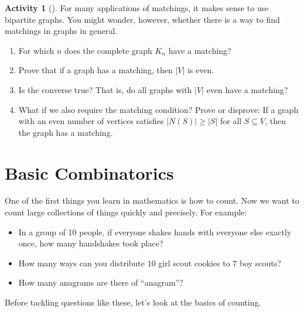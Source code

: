 \documentclass[10pt,]{book}
\theoremstyle{plain}
\theoremstyle{definition}
\theoremstyle{definition}
\theoremstyle{definition}
\newtheorem{activity}[project]{Activity}
\numberwithin{equation}{chapter}
\newcommand{\card}[1]{\left| #1 \right|}
\begin{document}
\begin{activity}[]\label{activity-55}
\hypertarget{p-462}{}%
For many applications of matchings, it makes sense to use bipartite graphs. You might wonder, however, whether there is a way to find matchings in graphs in general.%
\begin{enumerate}[font=\bfseries,label=(\alph*),ref=\alph*]
\item\label{task-66} \hypertarget{p-463}{}%
For which \(n\) does the complete graph \(K_n\) have a matching?%
\item\label{task-67} \hypertarget{p-464}{}%
Prove that if a graph has a matching, then \(\card{V}\) is even.%
\item\label{task-68} \hypertarget{p-465}{}%
Is the converse true?  That is, do all graphs with \(\card{V}\) even have a matching?%
\item\label{task-69} \hypertarget{p-466}{}%
What if we also require the matching condition?  Prove or disprove: If a graph with an even number of vertices satisfies \(\card{N(S)} \ge \card{S}\) for all \(S \subseteq V\), then the graph has a matching.%
\end{enumerate}
\end{activity}
\typeout{************************************************}
\typeout{************************************************}
\chapter[{Basic Combinatorics}]{Basic Combinatorics}\label{ch_basic-combinatorics}
\hypertarget{p-467}{}%
One of the first things you learn in mathematics is how to count. Now we want to count large collections of things quickly and precisely. For example: \leavevmode%
\begin{itemize}[label=\textbullet]
\item{}\hypertarget{p-468}{}%
In a group of 10 people, if everyone shakes hands with everyone else exactly once, how many handshakes took place?%
\item{}\hypertarget{p-469}{}%
How many ways can you distribute \(10\) girl scout cookies to \(7\) boy scouts?%
\item{}\hypertarget{p-470}{}%
How many anagrams are there of ``anagram''?%
\end{itemize}
%
\par
\hypertarget{p-471}{}%
Before tackling questions like these, let's look at the basics of counting.%
\typeout{************************************************}
\typeout{************************************************}
\end{document}
